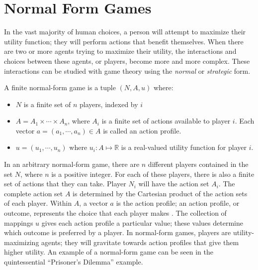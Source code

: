 \section{Normal Form Games}
In the vast majority of human choices, a person will attempt to maximize their utility function; they will perform actions that benefit themselves. When there are two or more agents trying to maximize their utility, the interactions and choices between these agents, or players, become more and more complex. These interactions can be studied with game theory using the \textit{normal} or \textit{strategic} form.
\begin{define}
  A finite normal-form game is a tuple $(N, A, u)$ where:
  \begin{itemize}
  \item $N$ is a finite set of $n$ players, indexed by $i$
  \item $A=A_1\times\cdots\times A_n$, where $A_i$ is a finite set of actions available to player $i$. Each vector $a=(a_1,\cdots ,a_n)\in A$ is called an action profile.
    \item $u=(u_1,\cdots ,u_n)$ where $u_i : A \mapsto\mathbb{R}$ is a real-valued utility function for player $i$. \cite{shoh09}
\end{itemize}
\end{define}

In an arbitrary normal-form game, there are $n$ different players contained in the set $N$, where $n$ is a positive integer. For each of these players, there is also a finite set of actions that they can take. Player $N_i$ will have the action set $A_i$. The complete action set $A$ is determined by the Cartesian product of the action sets of each player. Within $A$, a vector $a$ is the action profile; an action profile, or outcome, represents the choice that each player makes \cite{osbo94}. The collection of mappings $u$ gives each action profile a particular value; these values determine which outcome is preferred by a player. In normal-form games, players are utility-maximizing agents; they will gravitate towards action profiles that give them higher utility. An example of a normal-form game can be seen in the quintessential ``Prisoner's Dilemma'' example.\\

